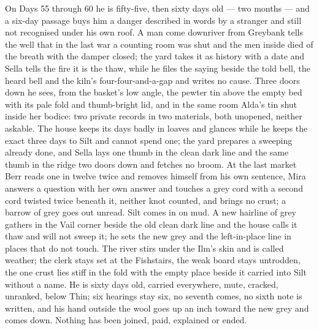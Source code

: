 \documentclass{design/chronicle}
\begin{document}
{On Days 55 through 60 he is fifty-five, then sixty days old --- two months --- and a six-day passage buys him a danger described in words by a stranger and still not recognised under his own roof. A man come downriver from Greybank tells the well that in the last war a counting room was shut and the men inside died of the breath with the damper closed; the yard takes it as history with a date and Sella tells the fire it is the thaw, while he files the saying beside the told bell, the heard bell and the kiln’s four-four-and-a-gap and writes no cause. Three doors down he sees, from the basket’s low angle, the pewter tin above the empty bed with its pale fold and thumb-bright lid, and in the same room Alda’s tin shut inside her bodice: two private records in two materials, both unopened, neither askable. The house keeps its days badly in loaves and glances while he keeps the exact three days to Silt and cannot spend one; the yard prepares a sweeping already done, and Sella lays one thumb in the clean dark line and the same thumb in the ridge two doors down and fetches no broom. At the last market Berr reads one in twelve twice and removes himself from his own sentence, Mira answers a question with her own answer and touches a grey cord with a second cord twisted twice beneath it, neither knot counted, and brings no crust; a barrow of grey goes out unread. Silt comes in on mud. A new hairline of grey gathers in the Vail corner beside the old clean dark line and the house calls it thaw and will not sweep it; he sets the new grey and the left-in-place line in places that do not touch. The river stirs under the Ilm’s skin and is called weather; the clerk stays set at the Fishstairs, the weak board stays untrodden, the one crust lies stiff in the fold with the empty place beside it carried into Silt without a name. He is sixty days old, carried everywhere, mute, cracked, unranked, below Thin; six hearings stay six, no seventh comes, no sixth note is written, and his hand outside the wool goes up an inch toward the new grey and comes down. Nothing has been joined, paid, explained or ended.

}
\end{document}
